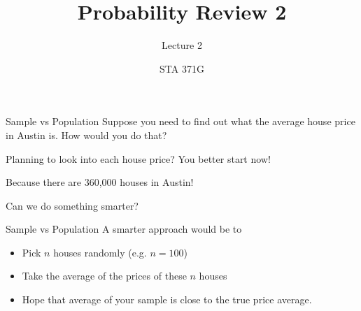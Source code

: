 \documentclass{beamer}\usepackage[]{graphicx}\usepackage[]{color}
\title{Probability Review 2}
\subtitle{Lecture 2}
\author{STA 371G}
\begin{document}
  
  

  \frame{\maketitle}



   \begin{darkframes}
  

	\begin{frame}[label=lists]{Sample vs Population}
    	Suppose you need to find out what the average house price in Austin is. How would you do that? 
    	
		\begin{figure} 
			\centering
			\setlength\fboxsep{0pt}
			\setlength\fboxrule{0.5pt}
		\end{figure}  
			
		
		Planning to look into each house price? You better start now! 
		
		Because there are 360,000 houses in Austin!  
		
		Can we do something smarter? 
		
     
      
    \end{frame}    
    
    
    
    \begin{frame}[label=lists]{Sample vs Population}
    	A smarter approach would be to
   		\begin{itemize}
   			\item Pick $n$ houses randomly (e.g. $n=100$)
   			\item Take the average of the prices of these $n$ houses
   			\item Hope that average of your sample is close to the true price average.
   		\end{itemize}
   		

\end{frame}
\end{darkframes}
\end{document}
